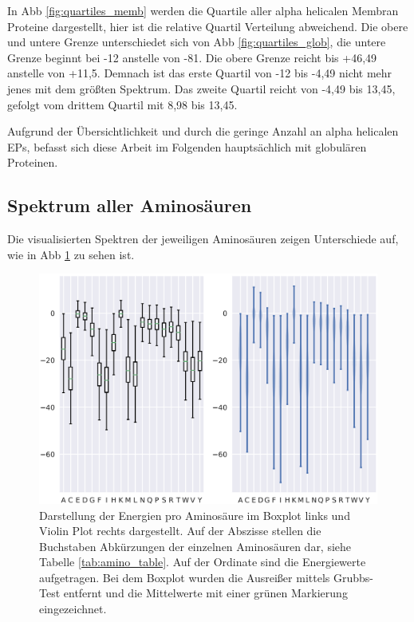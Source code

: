 In \ac{Abb} \ref{fig:quartiles_memb} werden die Quartile aller alpha helicalen Membran Proteine dargestellt, hier ist die relative Quartil Verteilung abweichend. Die obere und untere Grenze unterschiedet sich von \ac{Abb} \ref{fig:quartiles_glob}, die untere Grenze beginnt bei -12 anstelle von -81. Die obere Grenze reicht bis +46,49 anstelle von +11,5. Demnach ist das erste Quartil von -12 bis -4,49 nicht mehr jenes mit dem größten Spektrum. Das zweite Quartil reicht von -4,49 bis 13,45, gefolgt vom drittem Quartil mit 8,98 bis 13,45.

Aufgrund der Übersichtlichkeit und durch die geringe Anzahl an alpha helicalen \ac{EP}s, befasst sich diese Arbeit im Folgenden hauptsächlich mit globulären Proteinen. 


\subsection{Spektrum aller Aminosäuren}

Die visualisierten Spektren der jeweiligen Aminosäuren zeigen Unterschiede auf, wie in \ac{Abb} \ref{fig:energy_ranges} zu sehen ist.

\begin{figure}
    \centering
    \includegraphics[width=.99\textwidth]{images/BoxPlot_energy_rages.png}
    \caption{Darstellung der Energien pro Aminosäure im Boxplot links und Violin Plot rechts dargestellt. Auf der Abszisse stellen die Buchstaben Abkürzungen der einzelnen Aminosäuren dar, siehe Tabelle \ref{tab:amino_table}. Auf der Ordinate sind die Energiewerte aufgetragen. Bei dem Boxplot wurden die Ausreißer mittels Grubbs-Test entfernt und die Mittelwerte mit einer grünen Markierung eingezeichnet.}
    \label{fig:energy_ranges}
\end{figure}

